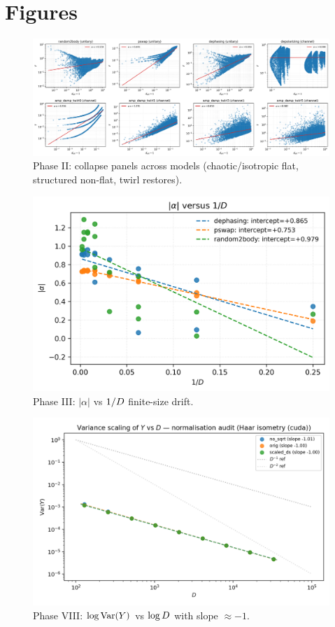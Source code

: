 \documentclass[11pt]{article}
\begin{document}
\section{Figures}
\begin{figure}[h]
\centering
\includegraphics[width=0.95\linewidth]{phase2_collapse_panels.png}
\caption{Phase II: collapse panels across models (chaotic/isotropic flat, structured non-flat, twirl restores).}
\end{figure}

\begin{figure}[h]
\centering
\includegraphics[width=0.75\linewidth]{phase3_alpha_vs_invD.png}
\caption{Phase III: $|\alpha|$ vs $1/D$ finite-size drift.}
\end{figure}

\begin{figure}[h]
\centering
\includegraphics[width=0.75\linewidth]{phase8_var_scaling.png}
\caption{Phase VIII: $\log \mathrm{Var}(Y)$ vs $\log D$ with slope $\approx -1$.}
\end{figure}
\end{document}
